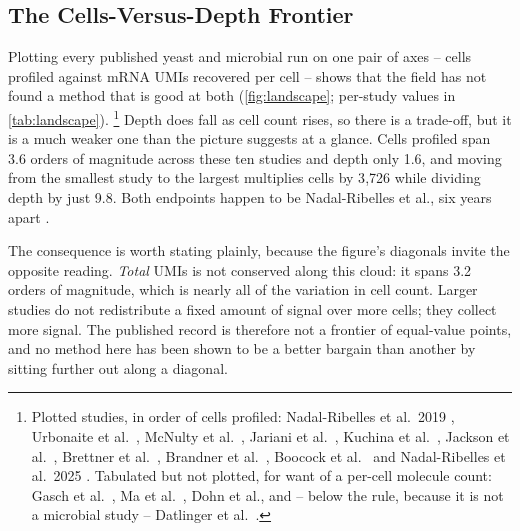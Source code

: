 \subsection{The Cells-Versus-Depth Frontier}
\label{sec:landscape}

Plotting every published yeast and microbial run on one pair of axes -- cells
profiled against mRNA UMIs recovered per cell -- shows that the field has not
found a method that is good at both (\cref{fig:landscape}; per-study values in
\cref{tab:landscape}).%
\footnote{Plotted studies, in order of cells profiled:
Nadal-Ribelles et al.\ 2019 \citep{nadal-ribellesSensitiveHighthroughputSinglecell2019},
Urbonaite et al.\ \citep{urbonaiteYeastoptimizedSinglecellTranscriptomics2021},
McNulty et al.\ \citep{mcnultyProbebasedBacterialSinglecell2023},
Jariani et al.\ \citep{jarianiNewProtocolSinglecell2020},
Kuchina et al.\ \citep{kuchinaMicrobialSinglecellRNA2021},
Jackson et al.\ \citep{jacksonGeneRegulatoryNetwork2020},
Brettner et al.\ \citep{brettnerUltraHighthroughputMassively2024},
Brandner et al.\ \citep{brandnerPooledSinglecellCRISPRa2025},
Boocock et al.\ \citep{boocockSinglecellEQTLMapping2025} and
Nadal-Ribelles et al.\ 2025 \citep{nadal-ribellesSinglecellResolvedGenotypephenotype2025}.
Tabulated but not plotted, for want of a per-cell molecule count:
Gasch et al.\ \citep{gaschSinglecellRNASequencing2017},
Ma et al.\ \citep{maBacterialDropletbasedSinglecell2023}, Dohn et al., and --
below the rule, because it is not a microbial study -- Datlinger et al.\
\citep{datlingerUltrahighthroughputSinglecellRNA2021}.} Depth does fall as cell count rises, so there is a
trade-off, but it is a much weaker one than the picture suggests at a glance.
Cells profiled span 3.6 orders of magnitude across these ten studies and depth
only 1.6, and moving from the smallest study to the largest multiplies cells by
3{,}726 while dividing depth by just 9.8. Both endpoints happen to be
Nadal-Ribelles et al., six years apart
\citep{nadal-ribellesSensitiveHighthroughputSinglecell2019,
nadal-ribellesSinglecellResolvedGenotypephenotype2025}.

The consequence is worth stating plainly, because the figure's diagonals invite
the opposite reading. \emph{Total} UMIs is not conserved along this cloud: it
spans 3.2 orders of magnitude, which is nearly all of the variation in cell
count. Larger studies do not redistribute a fixed amount of signal over more
cells; they collect more signal. The published record is therefore not a frontier
of equal-value points, and no method here has been shown to be a better bargain
than another by sitting further out along a diagonal.

